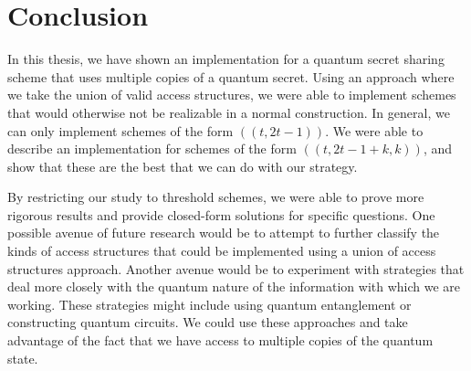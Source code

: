 \chapter*{Conclusion}
\label{conclusion}

In this thesis, we have shown an implementation for a quantum secret sharing scheme that uses multiple copies of a quantum secret. Using an approach where we take the union of valid access structures, we were able to implement schemes that would otherwise not be realizable in a normal construction. In general, we can only implement schemes of the form $((t,2t-1))$. We were able to describe an implementation for schemes of the form $((t,2t-1+k,k))$, and show that these are the best that we can do with our strategy.

By restricting our study to threshold schemes, we were able to prove more rigorous results and provide closed-form solutions for specific questions. One possible avenue of future research would be to attempt to further classify the kinds of access structures that could be implemented using a union of access structures approach. Another avenue would be to experiment with strategies that deal more closely with the quantum nature of the information with which we are working. These strategies might include using quantum entanglement or constructing quantum circuits. We could use these approaches and take advantage of the fact that we have access to multiple copies of the quantum state.